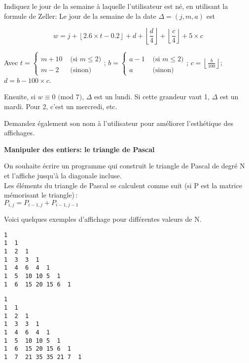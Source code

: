 \documentclass[10pt]{article}\usepackage[correction]{esial}
\begin{document}
\Question Indiquez le jour de la semaine à laquelle l'utilisateur est né, en
utilisant la formule de Zeller: Le jour de la semaine de la date
$\Delta=(j,m,a)$ est 

$$w=j+\left\lfloor 2.6\times t - 0.2 \right\rfloor + d + 
 \left\lfloor \frac{d}{4} \right\rfloor + 
 \left\lfloor \frac{c}{4} \right\rfloor + 5\times c
$$

Avec $\displaystyle t=\left\{\begin{array}{ll}\\
    m+10&\mbox{ (si } m\leq 2)\\
    m-2&\mbox{ (sinon)}
  \end{array}\right.$;  
  $\displaystyle
  b=\left\{\begin{array}{ll}\\
    a-1&\textrm{ (si } m\leq 2)\\
    a&\textrm{ (sinon)}
  \end{array}\right.$; 
  $\displaystyle
  c=\left\lfloor\frac{b}{100}\right\rfloor$;
  $\displaystyle
  d=b-100\times c$.
  
Ensuite, si $w\equiv 0\textrm{ (mod }7)$, $\Delta$ est un lundi. Si cette
grandeur vaut 1, $\Delta$ est un mardi. Pour 2, c'est un mercredi, etc.

\Question Demandez également son nom à l'utilisateur pour améliorer
l'esthétique des affichages.

\bigskip\Exercice\textbf{Manipuler des entiers: le triangle de Pascal}

On souhaite écrire un programme qui construit le triangle de Pascal de
degré N et l'affiche jusqu'à la diagonale incluse. \\

Les éléments du triangle de Pascal se calculent comme suit (si P est
la matrice mémorisant le triangle)\,: \\
$P_{i,j} = P_{i-1,j} + P_{i-1,j-1}$

Voici quelques exemples d'affichage pour différentes valeurs de N.

\bigskip\noindent\begin{minipage}{.45\linewidth}
  \begin{Verbatim}[label=Affichage quand N vaut 6]
1 
1  1
1  2  1
1  3  3  1
1  4  6  4  1
1  5  10 10 5  1
1  6  15 20 15 6  1    
  \end{Verbatim}
\end{minipage}\hfill
\begin{minipage}{.45\linewidth}
  \begin{Verbatim}[label=Affichage quand N vaut 7]
1 
1  1
1  2  1
1  3  3  1
1  4  6  4  1
1  5  10 10 5  1
1  6  15 20 15 6  1    
1  7  21 35 35 21 7  1
  \end{Verbatim}
\end{minipage}
\end{document}
